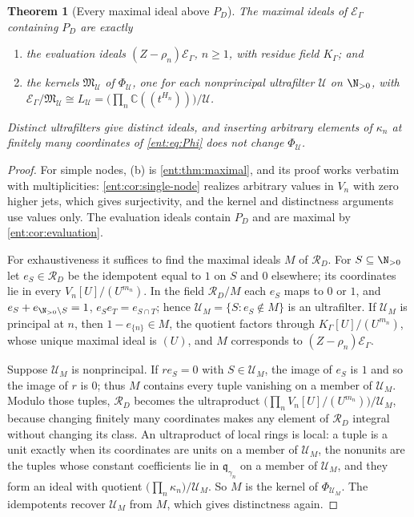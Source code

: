 \documentclass[11pt]{article}
\newtheorem{theorem}{Theorem}[section]
\theoremstyle{plain}
\theoremstyle{plain}
\theoremstyle{plain}
\theoremstyle{definition}
\theoremstyle{definition}
\theoremstyle{definition}
\theoremstyle{definition}
\theoremstyle{remark}
\newcommand{\C}{\mathbb C}\newcommand{\R}{\mathbb R}
\newcommand{\K}{K_\Gamma}\newcommand{\KD}{K_\Delta}
\newcommand{\E}{\mathcal E_\Gamma}
\newcommand{\RD}{\mathcal R_D}\newcommand{\Ucal}{\mathcal U}
\begin{document}
\begin{theorem}[Every maximal ideal above $P_D$]\label{ent:sm:thm:maximal-all}
The maximal ideals of $\E$ containing $P_D$ are exactly
\begin{enumerate}[label=\textnormal{(\alph*)},leftmargin=2em]
\item the evaluation ideals $(Z-\rho_n)\E$, $n\ge1$, with residue field
$\K$; and
\item the kernels $\mathfrak M_\Ucal$ of $\Phi_\Ucal$, one for each
nonprincipal ultrafilter $\Ucal$ on $\N_{>0}$, with
$\E/\mathfrak M_\Ucal\cong L_\Ucal=\bigl(\prod_n\C((t^{H_n}))\bigr)/\Ucal$.
\end{enumerate}
Distinct ultrafilters give distinct ideals, and inserting arbitrary elements
of $\kappa_n$ at finitely many coordinates of \eqref{ent:eq:Phi} does not
change $\Phi_\Ucal$.
\end{theorem}
\begin{proof}
For simple nodes, (b) is \cref{ent:thm:maximal}, and its proof works verbatim
with multiplicities: \cref{ent:cor:single-node} realizes arbitrary values in
$V_n$ with zero higher jets, which gives surjectivity, and the kernel and
distinctness arguments use values only. The evaluation ideals contain $P_D$
and are maximal by \cref{ent:cor:evaluation}.

For exhaustiveness it suffices to find the maximal ideals $M$ of $\RD$. For
$S\subseteq\N_{>0}$ let $e_S\in\RD$ be the idempotent equal to $1$ on $S$ and
$0$ elsewhere; its coordinates lie in every $V_n[U]/(U^{m_n})$. In the field
$\RD/M$ each $e_S$ maps to $0$ or $1$, and $e_S+e_{\N_{>0}\setminus S}=1$,
$e_Se_T=e_{S\cap T}$; hence $\Ucal_M=\{S:e_S\notin M\}$ is an ultrafilter. If
$\Ucal_M$ is principal at $n$, then $1-e_{\{n\}}\in M$, the quotient factors
through $\K[U]/(U^{m_n})$, whose unique maximal ideal is $(U)$, and $M$
corresponds to $(Z-\rho_n)\E$.

Suppose $\Ucal_M$ is nonprincipal. If $re_S=0$ with $S\in\Ucal_M$, the image
of $e_S$ is $1$ and so the image of $r$ is $0$; thus $M$ contains every tuple
vanishing on a member of $\Ucal_M$. Modulo those tuples, $\RD$ becomes the
ultraproduct $\bigl(\prod_nV_n[U]/(U^{m_n})\bigr)/\Ucal_M$, because changing
finitely many coordinates makes any element of $\RD$ integral without
changing its class. An ultraproduct of local rings is local: a tuple is a
unit exactly when its coordinates are units on a member of $\Ucal_M$, the
nonunits are the tuples whose constant coefficients lie in
$\mathfrak q_{\gamma_n}$ on a member of $\Ucal_M$, and they form an ideal
with quotient $\bigl(\prod_n\kappa_n\bigr)/\Ucal_M$. So $M$ is the kernel of
$\Phi_{\Ucal_M}$. The idempotents recover $\Ucal_M$ from $M$, which gives
distinctness again.
\end{proof}
\end{document}
